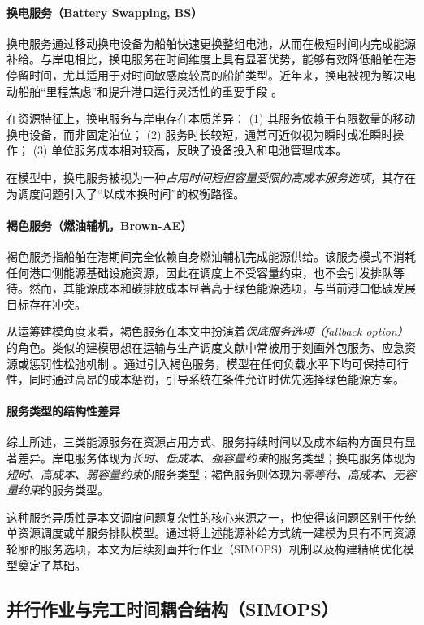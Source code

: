 \documentclass[UTF8, a4paper, 12pt]{ctexart}
\begin{document}
\paragraph{换电服务（Battery Swapping, BS）}
换电服务通过移动换电设备为船舶快速更换整组电池，从而在极短时间内完成能源补给。与岸电相比，换电服务在时间维度上具有显著优势，能够有效降低船舶在港停留时间，尤其适用于对时间敏感度较高的船舶类型。近年来，换电被视为解决电动船舶“里程焦虑”和提升港口运行灵活性的重要手段 \cite{wu2020battery,zhang2022maritime}。

在资源特征上，换电服务与岸电存在本质差异：  
(1) 其服务依赖于有限数量的移动换电设备，而非固定泊位；  
(2) 服务时长较短，通常可近似视为瞬时或准瞬时操作；  
(3) 单位服务成本相对较高，反映了设备投入和电池管理成本。

在模型中，换电服务被视为一种\emph{占用时间短但容量受限的高成本服务选项}，其存在为调度问题引入了“以成本换时间”的权衡路径。

\paragraph{褐色服务（燃油辅机，Brown-AE）}
褐色服务指船舶在港期间完全依赖自身燃油辅机完成能源供给。该服务模式不消耗任何港口侧能源基础设施资源，因此在调度上不受容量约束，也不会引发排队等待。然而，其能源成本和碳排放成本显著高于绿色能源选项，与当前港口低碳发展目标存在冲突。

从运筹建模角度来看，褐色服务在本文中扮演着\emph{保底服务选项（fallback option）}的角色。类似的建模思想在运输与生产调度文献中常被用于刻画外包服务、应急资源或惩罚性松弛机制 \cite{cordeau2015transportation,pinedo2016scheduling}。通过引入褐色服务，模型在任何负载水平下均可保持可行性，同时通过高昂的成本惩罚，引导系统在条件允许时优先选择绿色能源方案。

\paragraph{服务类型的结构性差异}
综上所述，三类能源服务在资源占用方式、服务持续时间以及成本结构方面具有显著差异。岸电服务体现为\emph{长时、低成本、强容量约束}的服务类型；换电服务体现为\emph{短时、高成本、弱容量约束}的服务类型；褐色服务则体现为\emph{零等待、高成本、无容量约束}的服务类型。

这种服务异质性是本文调度问题复杂性的核心来源之一，也使得该问题区别于传统单资源调度或单服务排队模型。通过将上述能源补给方式统一建模为具有不同资源轮廓的服务选项，本文为后续刻画并行作业（SIMOPS）机制以及构建精确优化模型奠定了基础。


\subsection{并行作业与完工时间耦合结构（SIMOPS）}
\label{sec:simops_structure}
\end{document}
